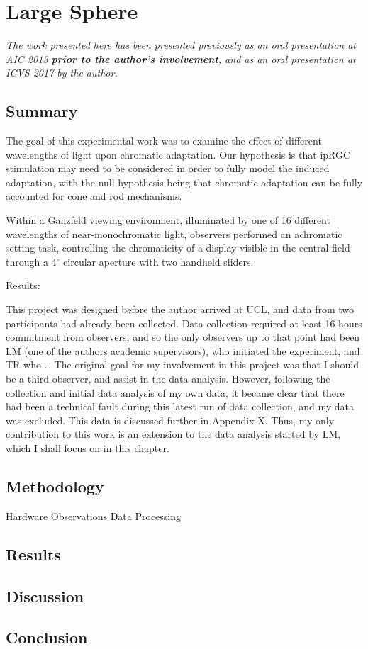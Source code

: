 \chapter{Large Sphere}
\label{chap:LargeSphere}

\textit{The work presented here has been presented previously as an oral presentation at AIC 2013 \citep[p. 623]{macdonald_chromatic_2013} \textbf{prior to the author's involvement}, and as an oral presentation at ICVS 2017 \citep[p. 35/58]{jan_kremers_24th_2017} by the author.}

\section{Summary}

The goal of this experimental work was to examine the effect of different wavelengths of light upon chromatic adaptation. Our hypothesis is that \gls{ipRGC} stimulation may need to be considered in order to fully model the induced adaptation, with the null hypothesis being that chromatic adaptation can be fully accounted for cone and rod mechanisms.

Within a Ganzfeld viewing environment, illuminated by one of 16 different wavelengths of near-monochromatic light, observers performed an achromatic setting task, controlling the chromaticity of a display visible in the central field through a 4$^{\circ}$ circular aperture with two handheld sliders.

Results:

This project was designed before the author arrived at \gls{UCL}, and data from two participants had already been collected. Data collection required at least 16 hours commitment from observers, and so the only observers up to that point had been LM (one of the authors academic supervisors), who initiated the experiment, and TR who \dots %
The original goal for my involvement in this project was that I should be a third observer, and assist in the data analysis. However, following the collection and initial data analysis of my own data, it became clear that there had been a technical fault during this latest run of data collection, and my data was excluded. This data is discussed further in Appendix X. %
Thus, my only contribution to this work is an extension to the data analysis started by LM, which I shall focus on in this chapter.

\section{Methodology}


Hardware
Observations
Data Processing

\section{Results}
\section{Discussion}
\section{Conclusion}